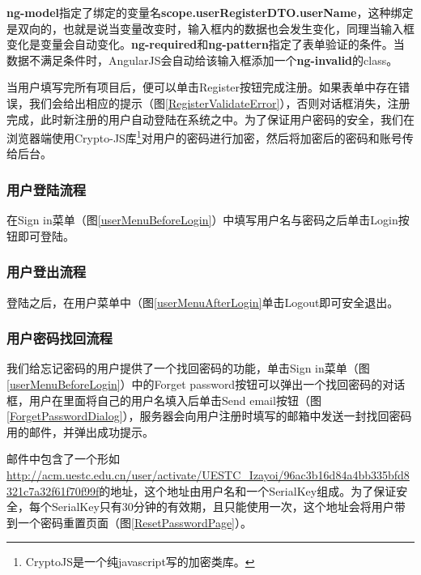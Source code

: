 \textbf{ng-model}指定了绑定的变量名\textbf{scope.userRegisterDTO.userName}，这种绑定是双向的，也就是说当变量改变时，输入框内的数据也会发生变化，同理当输入框变化是变量会自动变化。\textbf{ng-required}和\textbf{ng-pattern}指定了表单验证的条件。当数据不满足条件时，AngularJS会自动给该输入框添加一个\textbf{ng-invalid}的class。

当用户填写完所有项目后，便可以单击Register按钮完成注册。如果表单中存在错误，我们会给出相应的提示（图\ref{RegisterValidateError}），否则对话框消失，注册完成，此时新注册的用户自动登陆在系统之中。为了保证用户密码的安全，我们在浏览器端使用Crypto-JS库\footnote{CryptoJS是一个纯javascript写的加密类库。}对用户的密码进行加密，然后将加密后的密码和账号传给后台。


\subsubsection{用户登陆流程}
在Sign in菜单（图\ref{userMenuBeforeLogin}）中填写用户名与密码之后单击Login按钮即可登陆。

\subsubsection{用户登出流程}
登陆之后，在用户菜单中（图\ref{userMenuAfterLogin}单击Logout即可安全退出。

\subsubsection{用户密码找回流程}
我们给忘记密码的用户提供了一个找回密码的功能，单击Sign in菜单（图\ref{userMenuBeforeLogin}）中的Forget password按钮可以弹出一个找回密码的对话框，用户在里面将自己的用户名填入后单击Send email按钮（图\ref{ForgetPasswordDialog}），服务器会向用户注册时填写的邮箱中发送一封找回密码用的邮件，并弹出成功提示。


邮件中包含了一个形如\url{http://acm.uestc.edu.cn/user/activate/UESTC_Izayoi/96ac3b16d84a4bb335bfd8321c7a32f61f70f99f}的地址，这个地址由用户名和一个SerialKey组成。为了保证安全，每个SerialKey只有30分钟的有效期，且只能使用一次，这个地址会将用户带到一个密码重置页面（图\ref{ResetPasswordPage}）。


